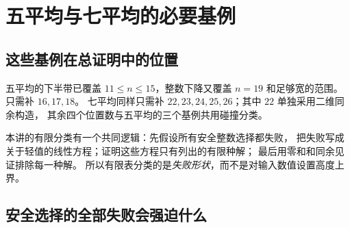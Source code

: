 \chapter{五平均与七平均的必要基例}\label{app:small}

\section{这些基例在总证明中的位置}
五平均的下半带已覆盖 $11\le n\le15$，整数下降又覆盖 $n=19$ 和足够宽的范围。
只需补 $16,17,18$。
七平均同样只需补 $22,23,24,25,26$；其中 $22$ 单独采用二维同余构造，
其余四个位置数与五平均的三个基例共用碰撞分类。

本讲的有限分类有一个共同逻辑：先假设所有安全整数选择都失败，
把失败写成关于轻值的线性方程；证明这些方程只有列出的有限种解；
最后用零和和同余见证排除每一种解。
所以有限表分类的是\emph{失败形状}，而不是对输入数值设置高度上界。

\section{安全选择的全部失败会强迫什么}

